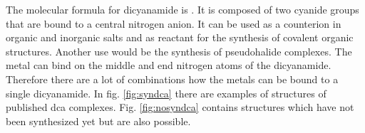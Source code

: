 The molecular formula for dicyanamide is . It is composed of two cyanide groups that are bound to a central nitrogen anion. It can be used as a counterion in organic and inorganic salts and as reactant for the synthesis of covalent organic structures.
Another use would be the synthesis of pseudohalide complexes. The metal  can bind on the middle and end nitrogen atoms of the dicyanamide. Therefore there are a lot of combinations how the metals can be bound to a single dicyanamide. \cite{holub} In fig. \ref{fig:syndca} there are examples of structures of published dca complexes. Fig. \ref{fig:nosyndca} contains structures which have not been synthesized yet but are also possible. 

\begin{figure}[h!]
\centering
{}
\quad
{}

\end{figure}
